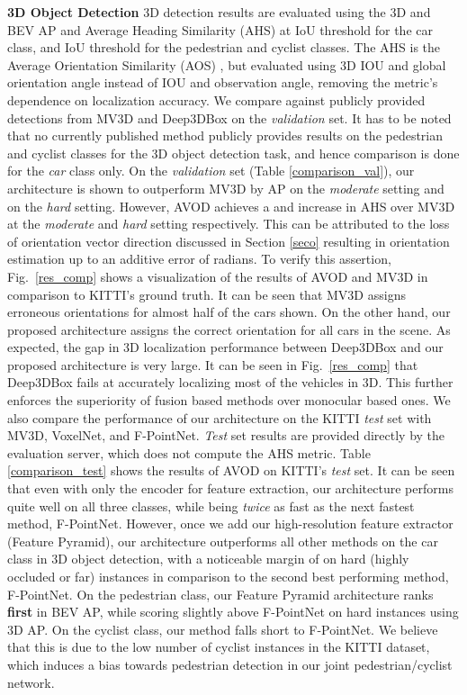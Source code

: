 \documentclass[letterpaper, 10 pt, conference]{ieeeconf}
\newcommand{\fig}[1]{Fig.~\ref{#1}}
\begin{document}
\noindent\textbf{3D Object Detection}
3D detection results are evaluated using the 3D and BEV AP and Average Heading Similarity (AHS) at  IoU threshold for the car class, and  IoU threshold for the pedestrian and cyclist classes. The AHS is the Average Orientation Similarity (AOS) \cite{geiger2012we}, but evaluated using 3D IOU and global orientation angle instead of  IOU and observation angle, removing the metric's dependence on localization accuracy. We compare against publicly provided detections from MV3D \cite{cvpr17chen} and Deep3DBox \cite{mousavian20163d} on the \textit{validation} set. It has to be noted that no currently published method publicly provides results on the pedestrian and cyclist classes for the 3D object detection task, and hence comparison is done for the \textit{car} class only. On the \textit{validation} set (Table \ref{comparison_val}), our architecture is shown to outperform MV3D by  AP on the \textit{moderate} setting and  on the \textit{hard} setting. However, AVOD achieves a  and  increase in AHS over MV3D at the \textit{moderate} and \textit{hard} setting respectively. This can be attributed to the loss of orientation vector direction discussed in Section \ref{seco} resulting in orientation estimation up to an additive error of  radians. To verify this assertion, \fig{res_comp} shows a visualization of the results of AVOD and MV3D in comparison to KITTI's ground truth. 
It can be seen that MV3D assigns erroneous orientations for almost half of the cars shown. On the other hand, our proposed architecture assigns the correct orientation for all cars in the scene. As expected, the gap in 3D localization performance between Deep3DBox and our proposed architecture is very large. It can be seen in \fig{res_comp} that Deep3DBox fails at accurately localizing most of the vehicles in 3D. This further enforces the superiority of fusion based methods over monocular based ones. We also compare the performance of our architecture on the KITTI \textit{test} set with MV3D, VoxelNet\cite{zhou2017voxelnet}, and F-PointNet\cite{qi2017frustum}. \textit{Test} set results are provided directly by the evaluation server, which does not compute the AHS metric. Table \ref{comparison_test} shows the results of AVOD on KITTI's \textit{test} set. It can be seen that even with only the encoder for feature extraction, our architecture performs quite well on all three classes, while being \textit{twice} as fast as the next fastest method, F-PointNet. However, once we add our high-resolution feature extractor (Feature Pyramid), our architecture outperforms all other methods on the car class in 3D object detection, with a noticeable margin of  on hard (highly occluded or far) instances in comparison to the second best performing method, F-PointNet. On the pedestrian class, our Feature Pyramid architecture ranks \textbf{first} in BEV AP, while scoring slightly above F-PointNet on hard instances using 3D AP. On the cyclist class, our method falls short to F-PointNet. We believe that this is due to the low number of cyclist instances in the KITTI dataset, which induces a bias towards pedestrian detection in our joint pedestrian/cyclist network. \\
\end{document}
